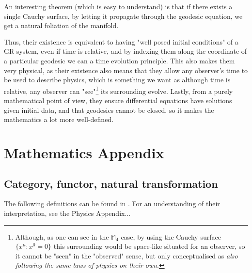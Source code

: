 \documentclass[a4paper,11pt]{article}
\numberwithin{equation}{section}
\theoremstyle{definition}
\begin{document}
    An interesting theorem (which is easy to understand) is that if there exists a single Cauchy surface, by letting it propagate through the geodesic equation, we get a natural foliation of the manifold.

    Thus, their existence is equivalent to having "well posed initial conditions" of a GR system, even if time is relative, and by indexing them along the coordinate of a particular geodesic we can a time evolution principle.
    This also makes them very physical, as their existence also means that they allow any observer's time to be used to describe physics, which is something we want as although time is relative, any observer can "see"\footnote{Although, as one can see in the $\mathbb{M}_4$ case, by using the Cauchy surface $\{x^\mu : x^0= 0\}$ this surrounding would be space-like situated for an observer, so it cannot be "seen" in the "observed" sense, but only conceptualised as \emph{also following the same laws of physics on their own}.} its surrounding evolve.
    Lastly, from a purely mathematical point of view, they ensure differential equations have solutions given initial data, and that geodesics cannot be closed, so it makes the mathematics a lot more well-defined.
    
\newpage
\section{Mathematics Appendix}
    \subsection{Category, functor, natural transformation} \label{AnMaCat}
    The following definitions can be found in \cite{AlgLang}. For an understanding of their interpretation, see the Physics Appendix...
\end{document}
